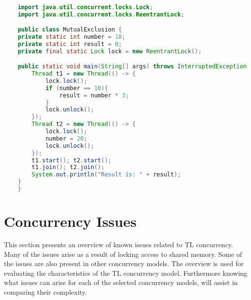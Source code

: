 \begin{lstlisting}[label=lst:mutualexclusion,
  caption={Mutual exclusion in Java using a lock},
  language=Java,  
  showspaces=false,
  showtabs=false,
  breaklines=true,
  showstringspaces=false,
  breakatwhitespace=true,
  commentstyle=\color{greencomments},
  keywordstyle=\color{bluekeywords},
  stringstyle=\color{redstrings}]  % Start your code-block

	import java.util.concurrent.locks.Lock;
	import java.util.concurrent.locks.ReentrantLock;

	public class MutualExclusion {
    private static int number = 10;
    private static int result = 0;
    private final static Lock lock = new ReentrantLock();

    public static void main(String[] args) throws InterruptedException {
        Thread t1 = new Thread(() -> {
            lock.lock();
            if (number == 10){
                result = number * 3;
            }
            lock.unlock();
        });
        Thread t2 = new Thread(() -> {
            lock.lock();
            number = 20;
            lock.unlock();
        });
        t1.start(); t2.start();
        t1.join(); t2.join();
        System.out.println("Result is: " + result);
    }
	}
\end{lstlisting}


\section{Concurrency Issues}\label{sec:tl_ci}
This section presents an overview of known issues related to \ac{TL} concurrency. Many of the issues arise as a result of locking access to shared memory. Some of the issues are also present in other concurrency models. The overview is used for evaluating the characteristics of the \ac{TL} concurrency model. Furthermore knowing what issues can arise for each of the selected concurrency models, will assist in comparing their complexity.
 
